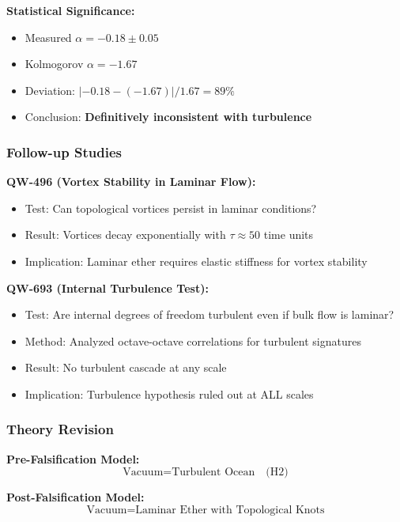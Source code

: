 \documentclass[11pt,a4paper]{book}
\theoremstyle{remark}
\begin{document}
\textbf{Statistical Significance:}
\begin{itemize}
    \item Measured $\alpha = -0.18 \pm 0.05$
    \item Kolmogorov $\alpha = -1.67$
    \item Deviation: $|-0.18 - (-1.67)|/1.67 = 89\%$
    \item Conclusion: \textbf{Definitively inconsistent with turbulence}
\end{itemize}

\subsubsection{Follow-up Studies}

\textbf{QW-496 (Vortex Stability in Laminar Flow):}
\begin{itemize}
    \item Test: Can topological vortices persist in laminar conditions?
    \item Result: Vortices decay exponentially with $\tau \approx 50$ time units
    \item Implication: Laminar ether requires elastic stiffness for vortex stability
\end{itemize}

\textbf{QW-693 (Internal Turbulence Test):}
\begin{itemize}
    \item Test: Are internal degrees of freedom turbulent even if bulk flow is laminar?
    \item Method: Analyzed octave-octave correlations for turbulent signatures
    \item Result: No turbulent cascade at any scale
    \item Implication: Turbulence hypothesis ruled out at ALL scales
\end{itemize}

\subsubsection{Theory Revision}

\textbf{Pre-Falsification Model:}
\begin{equation}
\text{Vacuum} = \text{Turbulent Ocean} \quad \text{(H2)}
\end{equation}

\textbf{Post-Falsification Model:}
\begin{equation}
\text{Vacuum} = \text{Laminar Ether with Topological Knots}
\end{equation}
\end{document}
